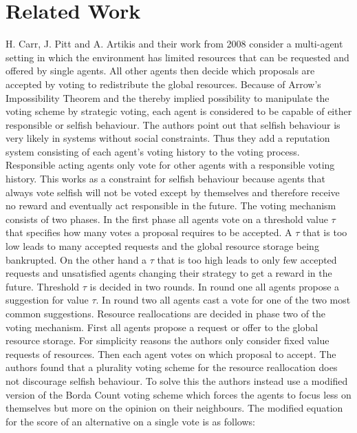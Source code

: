 \documentclass[conference]{IEEEtran}
\begin{document}
\section{Related Work}\label{3RelatedWork}
H. Carr, J. Pitt and A. Artikis and their work \cite{carr2008peer} from 2008 consider a multi-agent setting in which the environment has limited resources that can be requested and offered by single agents. All other agents then decide which proposals are accepted by voting to redistribute the global resources.
\newline
Because of Arrow's Impossibility Theorem and the thereby implied possibility to manipulate the voting scheme by strategic voting, each agent is considered to be capable of either responsible or selfish behaviour. The authors point out that selfish behaviour is very likely in systems without social constraints.
Thus they add a reputation system consisting of each agent's voting history to the voting process. Responsible acting agents only vote for other agents with a responsible voting history. This works as a constraint for selfish behaviour because agents that always vote selfish will not be voted except by themselves and therefore receive no reward and eventually act responsible in the future.
\newline
The voting mechanism consists of two phases. In the first phase all agents vote on a threshold value $\tau$ that specifies how many votes a proposal requires to be accepted. A $\tau$ that is too low leads to many accepted requests and the global resource storage being bankrupted. On the other hand a $\tau$ that is too high leads to only few accepted requests and unsatisfied agents changing their strategy to get a reward in the future.
Threshold $\tau$ is decided in two rounds. In round one all agents propose a suggestion for value $\tau$. In round two all agents cast a vote for one of the two most common suggestions.
Resource reallocations are decided in phase two of the voting mechanism. First all agents propose a request or offer to the global resource storage. For simplicity reasons the authors only consider fixed value requests of resources. Then each agent votes on which proposal to accept. The authors found that a plurality voting scheme for the resource reallocation does not discourage selfish behaviour. To solve this the authors instead use a modified version of the Borda Count voting scheme which forces the agents to focus less on themselves but more on the opinion on their neighbours. The modified equation for the score of an alternative on a single vote is as follows:\\
\end{document}
